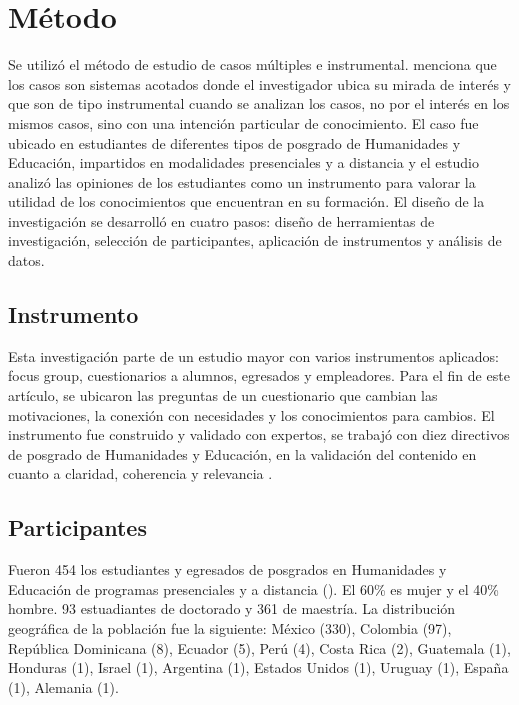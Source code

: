 \documentclass{textolivre}
\begin{document}
\section{Método}\label{sec-modelo}
Se utilizó el método de estudio de casos múltiples e instrumental. \textcite{yin_case_2009} menciona que los casos son sistemas acotados donde el investigador ubica su mirada de interés y que son de tipo instrumental cuando se analizan los casos, no por el interés en los mismos casos, sino con una intención particular de conocimiento. El caso fue ubicado en estudiantes de diferentes tipos de posgrado de Humanidades y Educación, impartidos en modalidades presenciales y a distancia y el estudio analizó las opiniones de los estudiantes como un instrumento para valorar la utilidad de los conocimientos que encuentran en su formación. El diseño de la investigación se desarrolló en cuatro pasos: diseño de herramientas de investigación, selección de participantes, aplicación de instrumentos y análisis de datos.

\subsection{Instrumento}\label{sec-organizacao}
Esta investigación parte de un estudio mayor con varios instrumentos aplicados: focus group, cuestionarios a alumnos, egresados y empleadores. Para el fin de este artículo, se ubicaron las preguntas de un cuestionario que cambian las motivaciones, la conexión con necesidades y los conocimientos para cambios. El instrumento fue construido y validado con expertos, se trabajó con diez directivos de posgrado de Humanidades y Educación, en la validación del contenido en cuanto a claridad, coherencia y relevancia \cite{escobar2008}.

\subsection{Participantes}\label{sec-organizacao-latex}
Fueron 454 los estudiantes y egresados de posgrados en Humanidades y Educación de programas presenciales y a distancia (). El 60\% es mujer y el 40\% hombre. 93 estuadiantes de doctorado y 361 de maestría. La distribución geográfica de la población fue la siguiente: México (330), Colombia (97), República Dominicana (8), Ecuador (5), Perú (4), Costa Rica (2), Guatemala (1), Honduras (1), Israel (1), Argentina (1), Estados Unidos (1), Uruguay (1), España (1), Alemania (1).
\end{document}
